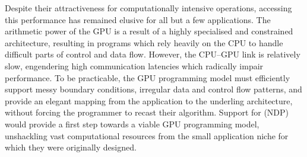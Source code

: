 Despite their attractiveness for computationally intensive operations, accessing
this performance has remained elusive for all but a few applications. The
arithmetic power of the GPU is a result of a highly specialised and constrained
architecture, resulting in programs which rely heavily on the CPU to handle
difficult parts of control and data flow. However, the CPU--GPU link is
relatively slow, engendering high communication latencies which radically impair
performance. To be practicable, the GPU programming model must efficiently
support messy boundary conditions, irregular data and control flow patterns, and
provide an elegant mapping from the application to the underling architecture,
without forcing the programmer to recast their algorithm. Support for
 \cite{Blelloch:1994,Blelloch:1996} (NDP) would
provide a first step towards a viable GPU programming model, unshackling vast
computational resources from the small application niche for which they were
originally designed.

